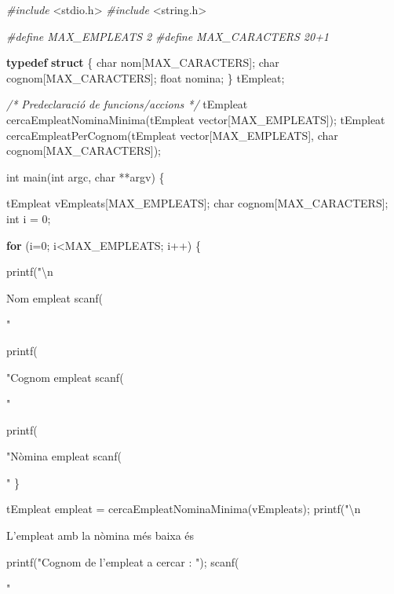 \documentclass[]{book}
\newenvironment{Shaded}{\begin{snugshade}}{\end{snugshade}}
\newcommand{\KeywordTok}[1]{\textcolor[rgb]{0.13,0.29,0.53}{\textbf{#1}}}
\newcommand{\DataTypeTok}[1]{\textcolor[rgb]{0.13,0.29,0.53}{#1}}
\newcommand{\DecValTok}[1]{\textcolor[rgb]{0.00,0.00,0.81}{#1}}
\newcommand{\SpecialCharTok}[1]{\textcolor[rgb]{0.00,0.00,0.00}{#1}}
\newcommand{\StringTok}[1]{\textcolor[rgb]{0.31,0.60,0.02}{#1}}
\newcommand{\ImportTok}[1]{#1}
\newcommand{\CommentTok}[1]{\textcolor[rgb]{0.56,0.35,0.01}{\textit{#1}}}
\newcommand{\ControlFlowTok}[1]{\textcolor[rgb]{0.13,0.29,0.53}{\textbf{#1}}}
\newcommand{\PreprocessorTok}[1]{\textcolor[rgb]{0.56,0.35,0.01}{\textit{#1}}}
\newcommand{\NormalTok}[1]{#1}
\begin{document}
\begin{Shaded}
\begin{Highlighting}[]
\PreprocessorTok{#include }\ImportTok{<stdio.h>}
\PreprocessorTok{#include }\ImportTok{<string.h>}

\PreprocessorTok{#define MAX_EMPLEATS 2}
\PreprocessorTok{#define MAX_CARACTERS 20+1}

\KeywordTok{typedef} \KeywordTok{struct}\NormalTok{ \{}
    \DataTypeTok{char}\NormalTok{ nom[MAX_CARACTERS];}
    \DataTypeTok{char}\NormalTok{ cognom[MAX_CARACTERS];}
    \DataTypeTok{float}\NormalTok{ nomina;}
\NormalTok{\} tEmpleat;}

\CommentTok{/* Predeclaració de funcions/accions */}
\NormalTok{tEmpleat cercaEmpleatNominaMinima(tEmpleat vector[MAX_EMPLEATS]);}
\NormalTok{tEmpleat cercaEmpleatPerCognom(tEmpleat vector[MAX_EMPLEATS], }\DataTypeTok{char}\NormalTok{ cognom[MAX_CARACTERS]);}

\DataTypeTok{int}\NormalTok{ main(}\DataTypeTok{int}\NormalTok{ argc, }\DataTypeTok{char}\NormalTok{ **argv) \{}

\NormalTok{    tEmpleat vEmpleats[MAX_EMPLEATS];}
    \DataTypeTok{char}\NormalTok{ cognom[MAX_CARACTERS];}
    \DataTypeTok{int}\NormalTok{ i = }\DecValTok{0}\NormalTok{;}

    \ControlFlowTok{for}\NormalTok{ (i=}\DecValTok{0}\NormalTok{; i<MAX_EMPLEATS; i++) \{}
     
\NormalTok{        printf(}\StringTok{"}\SpecialCharTok{\textbackslash{}n}\StringTok{Nom empleat %
\NormalTok{        scanf(}\StringTok{"%
        
\NormalTok{        printf(}\StringTok{"Cognom empleat %
\NormalTok{        scanf(}\StringTok{"%
        
\NormalTok{        printf(}\StringTok{"Nòmina empleat %
\NormalTok{        scanf(}\StringTok{"%
\NormalTok{    \}}

\NormalTok{    tEmpleat empleat = cercaEmpleatNominaMinima(vEmpleats);}
\NormalTok{    printf(}\StringTok{"}\SpecialCharTok{\textbackslash{}n}\StringTok{L'empleat amb la nòmina més baixa és %

\NormalTok{    printf(}\StringTok{"Cognom de l'empleat a cercar : "}\NormalTok{);}
\NormalTok{    scanf(}\StringTok{"%

}}}}}}}}
\end{Highlighting}
\end{Shaded}
\end{document}
